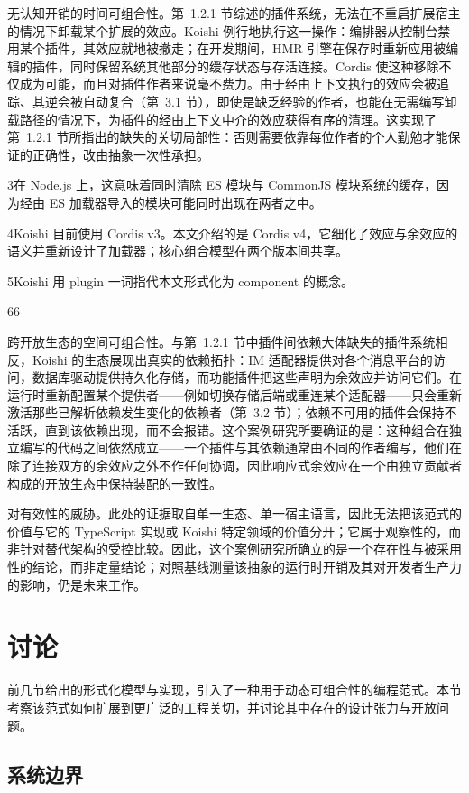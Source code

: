 \documentclass[
  10
]{article}
\begin{document}
无认知开销的时间可组合性。第~1.2.1 节综述的插件系统，无法在不重启扩展宿主的情况下卸载某个扩展的效应。Koishi 例行地执行这一操作：编排器从控制台禁用某个插件，其效应就地被撤走；在开发期间，HMR 引擎在保存时重新应用被编辑的插件，同时保留系统其他部分的缓存状态与存活连接。Cordis 使这种移除不仅成为可能，而且对插件作者来说毫不费力。由于经由上下文执行的效应会被追踪、其逆会被自动复合（第~3.1 节），即使是缺乏经验的作者，也能在无需编写卸载路径的情况下，为插件的经由上下文中介的效应获得有序的清理。这实现了第~1.2.1 节所指出的缺失的关切局部性：否则需要依靠每位作者的个人勤勉才能保证的正确性，改由抽象一次性承担。

3在 Node.js 上，这意味着同时清除 ES 模块与 CommonJS 模块系统的缓存，因为经由 ES 加载器导入的模块可能同时出现在两者之中。

4Koishi 目前使用 Cordis v3。本文介绍的是 Cordis v4，它细化了效应与余效应的语义并重新设计了加载器；核心组合模型在两个版本间共享。

5Koishi 用 plugin 一词指代本文形式化为 component 的概念。

66

跨开放生态的空间可组合性。与第~1.2.1 节中插件间依赖大体缺失的插件系统相反，Koishi 的生态展现出真实的依赖拓扑：IM 适配器提供对各个消息平台的访问，数据库驱动提供持久化存储，而功能插件把这些声明为余效应并访问它们。在运行时重新配置某个提供者——例如切换存储后端或重连某个适配器——只会重新激活那些已解析依赖发生变化的依赖者（第~3.2 节）；依赖不可用的插件会保持不活跃，直到该依赖出现，而不会报错。这个案例研究所要确证的是：这种组合在独立编写的代码之间依然成立——一个插件与其依赖通常由不同的作者编写，他们在除了连接双方的余效应之外不作任何协调，因此响应式余效应在一个由独立贡献者构成的开放生态中保持装配的一致性。

对有效性的威胁。此处的证据取自单一生态、单一宿主语言，因此无法把该范式的价值与它的 TypeScript 实现或 Koishi 特定领域的价值分开；它属于观察性的，而非针对替代架构的受控比较。因此，这个案例研究所确立的是一个存在性与被采用性的结论，而非定量结论；对照基线测量该抽象的运行时开销及其对开发者生产力的影响，仍是未来工作。
\section{讨论} \label{discussion}

前几节给出的形式化模型与实现，引入了一种用于动态可组合性的编程范式。本节考察该范式如何扩展到更广泛的工程关切，并讨论其中存在的设计张力与开放问题。

\subsection{系统边界} \label{system-boundary}
\end{document}
